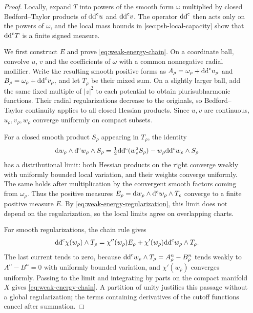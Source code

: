 \begin{proof}
Locally, expand $T$ into powers of the smooth form $\omega$ multiplied by closed Bedford--Taylor products of $\mathrm{dd}^{\mathrm{c}} u$ and $\mathrm{dd}^{\mathrm{c}} v$. The operator $\mathrm{dd}^{\mathrm{c}}$ then acts only on the powers of $\omega$, and the local mass bounds in \cref{sec:psh-local-capacity} show that $\mathrm{dd}^{\mathrm{c}} T$ is a finite signed measure.

We first construct $E$ and prove \eqref{eq:weak-energy-chain}. On a coordinate ball, convolve $u$, $v$ and the coefficients of $\omega$ with a common nonnegative radial mollifier. Write the resulting smooth positive forms as $A_\rho=\omega_\rho+\mathrm{dd}^{\mathrm{c}} u_\rho$ and $B_\rho=\omega_\rho+\mathrm{dd}^{\mathrm{c}} v_\rho$, and let $T_\rho$ be their mixed sum. On a slightly larger ball, add the same fixed multiple of $|z|^2$ to each potential to obtain plurisubharmonic functions. Their radial regularizations decrease to the originals, so Bedford--Taylor continuity applies to all closed Hessian products. Since $u,v$ are continuous, $u_\rho,v_\rho,w_\rho$ converge uniformly on compact subsets.

For a closed smooth product $S_\rho$ appearing in $T_\rho$, the identity
\begin{equation}\label{eq:weak-energy-regularization}
\mathrm{d} w_\rho\wedge\mathrm d^{\mathrm c} w_\rho\wedge S_\rho
=\tfrac12\mathrm{dd}^{\mathrm{c}}(w_\rho^2S_\rho)-w_\rho\mathrm{dd}^{\mathrm{c}} w_\rho\wedge S_\rho
\end{equation}
has a distributional limit: both Hessian products on the right converge weakly with uniformly bounded local variation, and their weights converge uniformly. The same holds after multiplication by the convergent smooth factors coming from $\omega_\rho$. Thus the positive measures $E_\rho=\mathrm{d} w_\rho\wedge\mathrm d^{\mathrm c} w_\rho\wedge T_\rho$ converge to a finite positive measure $E$. By \eqref{eq:weak-energy-regularization}, this limit does not depend on the regularization, so the local limits agree on overlapping charts.

For smooth regularizations, the chain rule gives
\[
\mathrm{dd}^{\mathrm{c}}\chi(w_\rho)\wedge T_\rho
=\chi''(w_\rho)E_\rho+\chi'(w_\rho)\mathrm{dd}^{\mathrm{c}} w_\rho\wedge T_\rho.
\]
The last current tends to zero, because $\mathrm{dd}^{\mathrm{c}} w_\rho\wedge T_\rho=A_\rho^n-B_\rho^n$ tends weakly to $A^n-B^n=0$ with uniformly bounded variation, and $\chi'(w_\rho)$ converges uniformly. Passing to the limit and integrating by parts on the compact manifold $X$ gives \eqref{eq:weak-energy-chain}. A partition of unity justifies this passage without a global regularization; the terms containing derivatives of the cutoff functions cancel after summation.


\end{proof}
